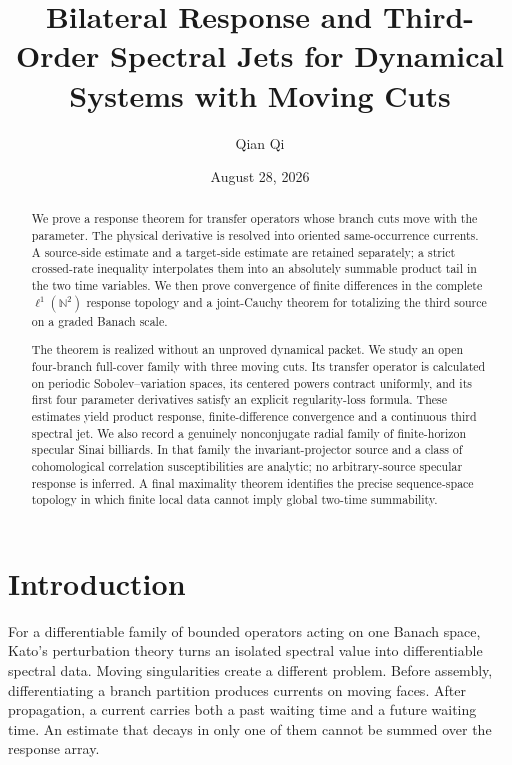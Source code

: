 \documentclass[11pt,reqno]{amsart}
\title[Bilateral response for moving cuts]{Bilateral Response and Third-Order Spectral Jets for Dynamical Systems with Moving Cuts}
\author{Qian Qi}
\date{August 28, 2026}
\theoremstyle{definition}
\theoremstyle{remark}
\newcommand{\N}{\mathbb N}
\begin{document}
\begin{abstract}
We prove a response theorem for transfer operators whose branch cuts move with
the parameter.  The physical derivative is resolved into oriented
same-occurrence currents.  A source-side estimate and a target-side estimate
are retained separately; a strict crossed-rate inequality interpolates them
into an absolutely summable product tail in the two time variables.  We then
prove convergence of finite differences in the complete
$\ell^1(\N^2)$ response topology and a joint-Cauchy theorem for totalizing the
third source on a graded Banach scale.

The theorem is realized without an unproved dynamical packet.  We study an
open four-branch full-cover family with three moving cuts.  Its transfer
operator is calculated on periodic Sobolev--variation spaces, its centered
powers contract uniformly, and its first four parameter derivatives satisfy
an explicit regularity-loss formula.  These estimates yield product response,
finite-difference convergence and a continuous third spectral jet.  We also
record a genuinely nonconjugate radial family of finite-horizon specular Sinai
billiards.  In that family the invariant-projector source and a class of
cohomological correlation susceptibilities are analytic; no arbitrary-source
specular response is inferred.  A final maximality theorem identifies the
precise sequence-space topology in which finite local data cannot imply global
two-time summability.
\end{abstract}

\maketitle
\tableofcontents

\section{Introduction}

For a differentiable family of bounded operators acting on one Banach space,
Kato's perturbation theory turns an isolated spectral value into differentiable
spectral data.  Moving singularities create a different problem.  Before
assembly, differentiating a branch partition produces currents on moving
faces.  After propagation, a current carries both a past waiting time and a
future waiting time.  An estimate that decays in only one of them cannot be
summed over the response array.
\end{document}
